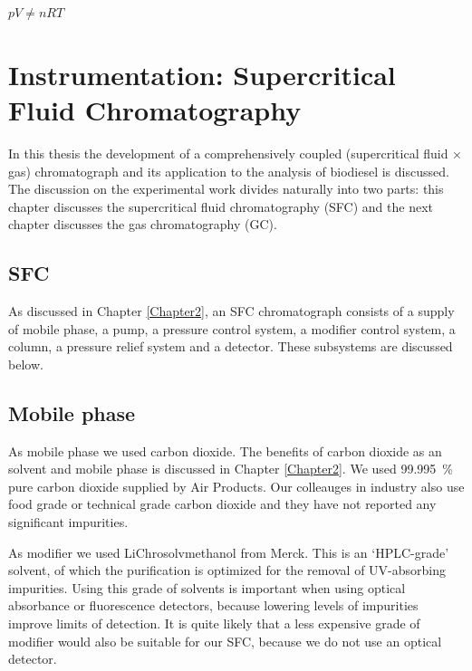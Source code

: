 
\begin{savequote}[\quotewidth]
$pV \neq nRT$ 
\end{savequote}

\chapter{Instrumentation: Supercritical Fluid Chromatography} %

\label{Chapter4} %

In this thesis the development of a comprehensively coupled (supercritical fluid
× gas) chromatograph and its application to the analysis of biodiesel is
discussed. The discussion on the experimental work divides naturally into two
parts: this chapter discusses the supercritical fluid chromatography (SFC) and
the next chapter discusses the gas chromatography (GC).

\section{SFC}

As discussed in Chapter \ref{Chapter2}, an SFC chromatograph consists of a
supply of mobile phase, a pump, a pressure control system, a modifier control
system, a column, a pressure relief system and a detector. These subsystems are
discussed below.

\section{Mobile phase}

As mobile phase we used carbon dioxide. The benefits of carbon dioxide as an
solvent and mobile phase is discussed in Chapter \ref{Chapter2}. We used
\SI{99.995}{\percent} pure carbon dioxide supplied by Air Products. Our
colleauges in industry also use food grade or technical grade carbon dioxide and
they have not reported any significant impurities.

As modifier we used LiChrosolv\textregistered methanol from Merck. This is an
`HPLC-grade' solvent, of which the purification is optimized for the removal of
UV-absorbing impurities. Using this grade of solvents is important when using
optical absorbance or fluorescence detectors, because lowering levels of
impurities improve limits of detection. It is quite likely that a less expensive
grade of modifier would also be suitable for our SFC, because we do not use an
optical detector.


